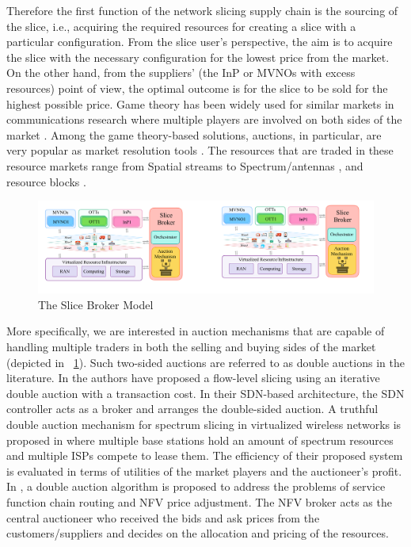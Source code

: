 Therefore the first function of the network slicing supply chain is the sourcing of the slice, i.e., acquiring the required resources for creating a slice with a particular configuration. From the slice user's perspective, the aim is to acquire the slice with the necessary configuration for the lowest price from the market. On the other hand, from the suppliers' (the \ac{InP} or \acp{MVNO} with excess resources) point of view, the optimal outcome is for the slice to be sold for the highest possible price. Game theory has been widely used for similar markets in communications research where multiple players are involved on both sides of the market \cite{CHARILAS20103421}. Among the game theory-based solutions, auctions, in particular, are very popular as market resolution tools \cite{8480631}. The resources that are traded in these resource markets range from Spatial streams \cite{7842378} to Spectrum/antennas \cite{7600959}, and resource blocks \cite{resource_blocks_auction}.
\begin{figure}[htbp]
    \centering
    \includegraphics[width=0.9\columnwidth]{Figures/ICC-model.pdf}
    \caption{The Slice Broker Model}
    \label{fig:Slice_broker}
\end{figure}
More specifically, we are interested in auction mechanisms that are capable of handling multiple traders in both the selling and buying sides of the market (depicted in \figureautorefname~\ref{fig:Slice_broker}). Such two-sided auctions are referred to as double auctions in the literature.
In \cite{7794896} the authors have proposed a flow-level slicing using an iterative double auction with a transaction cost. In their SDN-based architecture, the SDN controller acts as a broker and arranges the double-sided auction. 
A truthful double auction mechanism for spectrum slicing in virtualized wireless networks is proposed in \cite{ei2017game} where multiple base stations hold an amount of spectrum resources and multiple \acp{ISP} compete to lease them. The efficiency of their proposed system is evaluated in terms of utilities of the market players and the auctioneer's profit. 
In \cite{8542782}, a double auction algorithm is proposed to address the problems of service function chain routing and \ac{NFV} price adjustment. The \ac{NFV} broker acts as the central auctioneer who received the bids and ask prices from the customers/suppliers and decides on the allocation and pricing of the resources.

